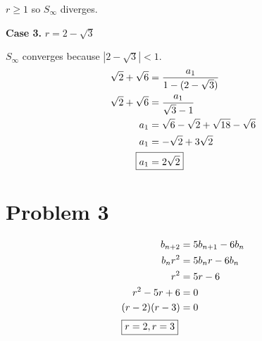 \documentclass{article}
\begin{document}
\begin{itemize}
\begin{minipage}[t]{0.25\linewidth}
	$r\geq1$ so $S_\infty$ diverges.
\end{minipage}
\begin{minipage}[t]{0.4\linewidth}
	\textbf{Case 3.} $r=2-\sqrt{3}$

	$S_\infty$ converges because $|2-\sqrt{3}|<1$.
	\begin{align*}
		\sqrt{2}+\sqrt{6}&=\frac{a_1}{1-(2-\sqrt{3})} \\
		\sqrt{2}+\sqrt{6}&=\frac{a_1}{\sqrt{3}-1} \\
		a_1&=\sqrt{6}-\sqrt{2}+\sqrt{18}-\sqrt{6} \\
		a_1&=-\sqrt{2}+3\sqrt{2} \\
		\Aboxed{a_1&=2\sqrt{2}}
	\end{align*}
\end{minipage}
\flushleft
\end{itemize}

\section*{Problem 3}
\setlength{\abovedisplayskip}{0pt}
\begin{align*}
	b_{n+2}&=5b_{n+1}-6b_n \\
	b_nr^2&=5b_nr-6b_n \\
	r^2&=5r-6 \\
	r^2-5r+6&=0 \\
	(r-2)(r-3)&=0 \\
	\intertext{\centering\boxed{r=2,r=3}}
\end{align*}
\end{document}
